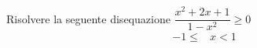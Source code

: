 		Risolvere la seguente disequazione $\dfrac{x^2+2x+1}{1-x^2}\geq 0$
	\begin{align*}
-1\leq& x<1\\
	\end{align*}
